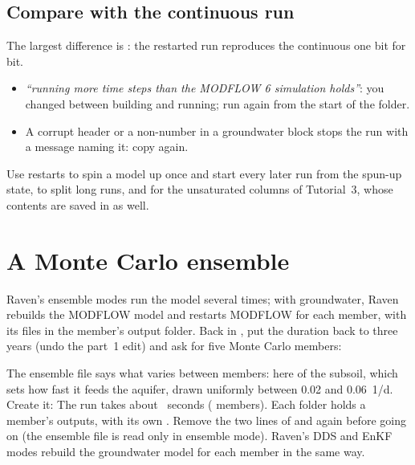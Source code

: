 \subsection{Compare with the continuous run}
\begin{tocheck}
The largest difference is : the restarted run reproduces the continuous one bit for bit.
\end{tocheck}
\begin{trouble}
\begin{itemize}
\item \emph{``running more time steps than the MODFLOW 6 simulation holds''}: you changed  between building
      and running; run again from the start of the folder.
\item A corrupt  header or a non-number in a groundwater block stops the run with a message naming it: copy
       again.
\end{itemize}
\end{trouble}
Use restarts to spin a model up once and start every later run from the spun-up state, to split long runs, and for the
unsaturated columns of Tutorial~3, whose contents are saved in  as well.

\section{A Monte Carlo ensemble}
Raven's ensemble modes run the model several times; with groundwater, Raven rebuilds the MODFLOW model and restarts
MODFLOW for each member, with its files in the member's output folder. Back in , put the
duration back to three years (undo the part~1 edit) and ask for five Monte Carlo members:
The ensemble file  says what varies between members: here  of the subsoil, which sets how
fast it feeds the aquifer, drawn uniformly between 0.02 and 0.06~1/d. Create it:
The run takes about ~seconds ( members). Each  folder holds a member's outputs, with its own
.
Remove the two lines of  and  again before going on (the ensemble file is read only in
ensemble mode). Raven's DDS and EnKF modes rebuild the groundwater model for each member in the same way.

